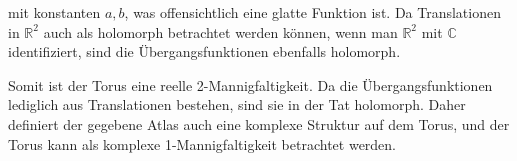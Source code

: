 mit konstanten \(a, b\), was offensichtlich eine glatte Funktion ist. Da Translationen in \(\mathbb{R}^2\) auch als holomorph betrachtet werden können, wenn man \(\mathbb{R}^2\) mit \(\mathbb{C}\) identifiziert, sind die Übergangsfunktionen ebenfalls holomorph.

Somit ist der Torus eine reelle 2-Mannigfaltigkeit. Da die Übergangsfunktionen lediglich aus Translationen bestehen, sind sie in der Tat holomorph. Daher definiert der gegebene Atlas auch eine komplexe Struktur auf dem Torus, und der Torus kann als komplexe 1-Mannigfaltigkeit betrachtet werden.

